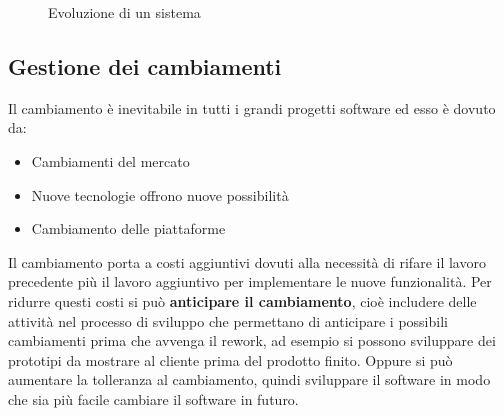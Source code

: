 \documentclass[a4paper]{article}
\begin{document}
\begin{figure}[H]
  \centering
  \caption{Evoluzione di un sistema}
\end{figure}

\subsection{Gestione dei cambiamenti}
Il cambiamento è inevitabile in tutti i grandi progetti software ed esso è dovuto da:
\begin{itemize}
  \item Cambiamenti del mercato
  \item Nuove tecnologie offrono nuove possibilità
  \item Cambiamento delle piattaforme
\end{itemize}
Il cambiamento porta a costi aggiuntivi dovuti alla necessità di rifare il lavoro
precedente più il lavoro aggiuntivo per implementare le nuove funzionalità. Per
ridurre questi costi si può \textbf{anticipare il cambiamento}, cioè includere delle
attività nel processo di sviluppo che permettano di anticipare i possibili cambiamenti
prima che avvenga il rework, ad esempio si possono sviluppare dei prototipi da mostrare
al cliente prima del prodotto finito. Oppure si può aumentare la tolleranza al cambiamento,
quindi sviluppare il software in modo che sia più facile cambiare il software in futuro.
\end{document}
